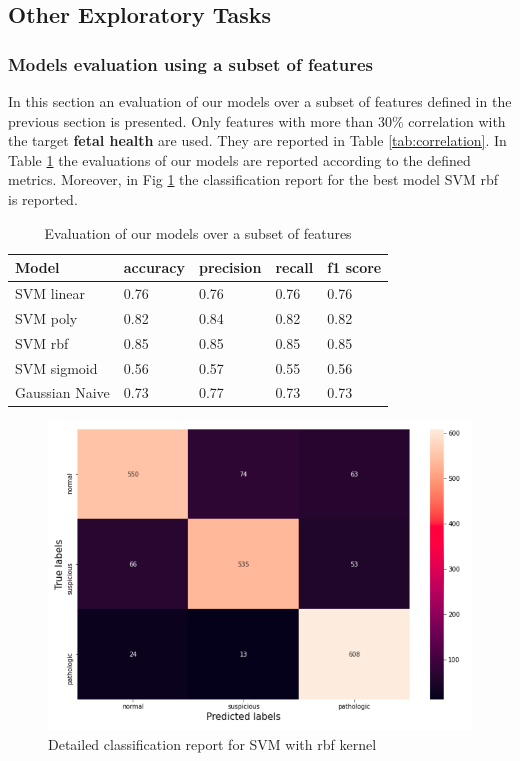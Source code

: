 \documentclass[a4paper,12pt]{article}
\begin{document}
\subsection{Other Exploratory Tasks}

\subsubsection{Models evaluation using a subset of features}

In this section an evaluation of our models over a subset of features defined in the previous section is presented. Only features with more than 30\% correlation with the target \textbf{fetal health} are used. They are reported in Table \ref{tab:correlation}. In Table \ref{tab:subset} the evaluations of our models are reported according to the defined metrics. Moreover, in Fig \ref{fig:poly} the classification report for the best model SVM rbf is reported.

\begin{table}[H]
\begin{tabular}{ |p{6cm}||p{2cm}|p{2cm}|p{2cm}|p{2cm}| }
  \hline
  Model& accuracy & precision  &  recall & f1 score \\
  \hline
  SVM linear &          0.76&   0.76&  0.76&  0.76\\
  SVM poly   &          0.82&   0.84&  0.82&  0.82\\
  SVM rbf    &          0.85&   0.85&  0.85&  0.85\\
  SVM sigmoid &         0.56&   0.57&  0.55&  0.56\\
  Gaussian Naive &         0.73&   0.77&  0.73&  0.73\\
  \hline
\end{tabular}
\caption{Evaluation of our models over a subset of features}
\label{tab:subset}
\end{table}

\begin{figure}[H]
  \begin{center}
  \includegraphics[width=1.0\textwidth]{images/svm_rbf_corr.png}
  \end{center}
  \caption{Detailed classification report for SVM with rbf kernel}
  \label{fig:poly}
\end{figure}
\end{document}
